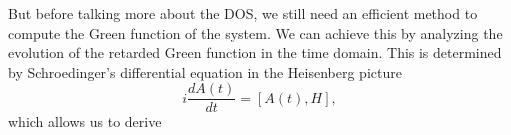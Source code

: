 



 


 
 
But before talking more about the DOS,  we still  need an efficient method to compute the Green function of the system. We can achieve this by analyzing  the evolution of the retarded Green function in the time domain. This is determined by Schroedinger's differential equation
in the Heisenberg picture 
\begin{equation}
i\frac{dA(t)}{dt} =\left[A(t),H\right],
\end{equation}
\noindent which allows us to derive


